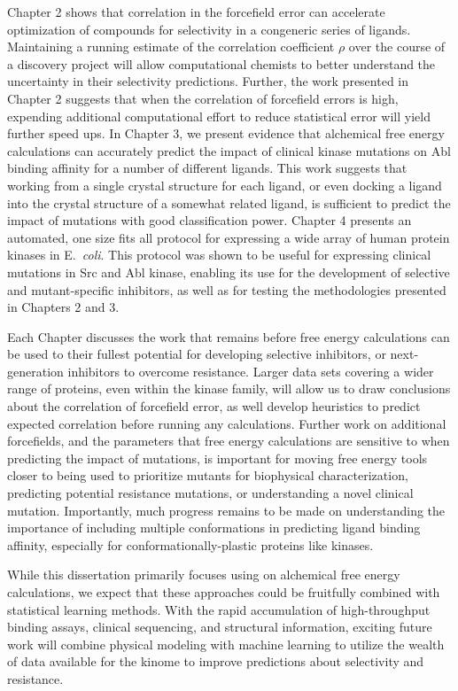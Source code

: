 \documentclass[phd,tocprelim]{cornell}
\begin{document}
Chapter 2 shows that correlation in the forcefield error can accelerate optimization of compounds for selectivity in a congeneric series of ligands. Maintaining a running estimate of the correlation coefficient $\rho$ over the course of a discovery project will allow computational chemists to better understand the uncertainty in their selectivity predictions. Further, the work presented in Chapter 2 suggests that when the correlation of forcefield errors is high, expending additional computational effort to reduce statistical error will yield further speed ups. In Chapter 3, we present evidence that alchemical free energy calculations can accurately predict the impact of clinical kinase mutations on Abl binding affinity for a number of different ligands. This work suggests that working from a single crystal structure for each ligand, or even docking a ligand into the crystal structure of a somewhat related ligand, is sufficient to predict the impact of mutations with good classification power. Chapter 4 presents an automated, one size fits all protocol for expressing a wide array of human protein kinases in E.~\emph{coli}. This protocol was shown to be useful for expressing clinical mutations in Src and Abl kinase, enabling its use for the development of selective and mutant-specific inhibitors, as well as for testing the methodologies presented in Chapters 2 and 3. 

Each Chapter discusses the work that remains before free energy calculations can be used to their fullest potential for developing selective inhibitors, or next-generation inhibitors to overcome resistance. Larger data sets covering a wider range of proteins, even within the kinase family, will allow us to draw conclusions about the correlation of forcefield error, as well develop heuristics to predict expected correlation before running any calculations. Further work on additional forcefields, and the parameters that free energy calculations are sensitive to when predicting the impact of mutations, is important for moving free energy tools closer to being used to prioritize mutants for biophysical characterization, predicting potential resistance mutations, or understanding a novel clinical mutation. Importantly, much progress remains to be made on understanding the importance of including multiple conformations in predicting ligand binding affinity, especially for conformationally-plastic proteins like kinases. 

While this dissertation primarily focuses using on alchemical free energy calculations, we expect that these approaches could be fruitfully combined with statistical learning methods. With the rapid accumulation of high-throughput binding assays, clinical sequencing, and structural information, exciting future work will combine physical modeling with machine learning to utilize the wealth of data available for the kinome to improve predictions about selectivity and resistance. 
\end{document}
